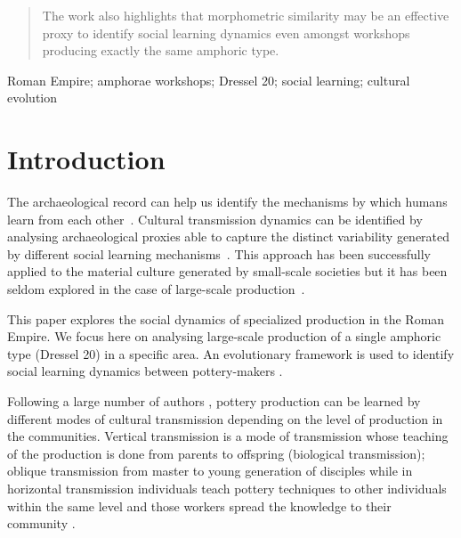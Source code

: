 \documentclass[review]{elsarticle}
\begin{document}
\begin{frontmatter}
\begin{abstract}
The work also highlights that morphometric similarity may be an effective proxy to identify social learning dynamics even amongst workshops producing exactly the same amphoric type. 

\end{abstract}


\begin{keyword}
Roman Empire; amphorae workshops; Dressel 20; social learning; cultural evolution
\end{keyword}

\end{frontmatter}

\linenumbers

\section{Introduction}

The archaeological record can help us identify the mechanisms by which humans learn from each other~\citep{richerson2005not,eerkens_jelmer_cultural_2007}. Cultural transmission dynamics can be identified by analysing archaeological proxies able to capture the distinct variability generated by different social learning mechanisms~\citep{shennan_ceramic_2001,eerkens_jelmer_cultural_2005, gandon_copying_2014}. This approach has been successfully applied to the material culture generated by small-scale societies but it has been seldom explored in the case of large-scale production~\citep{shennan_isolation-by-distance_2015}.

This paper explores the social dynamics of specialized production in the Roman Empire. We focus here on analysing large-scale production of a single amphoric type (Dressel 20) in a specific area. An evolutionary framework is used to identify social learning dynamics between pottery-makers \citep{shennan_evolution_2008,mesoudi_cultural_2015}. 

Following a large number of authors \citep{neff1992ceramics,shennan_genes_2002,bowser_learning_2008,hosfield_modes_2009}, pottery production can be learned by different modes of cultural transmission depending on the level of production in the communities. Vertical transmission is a mode of transmission whose teaching of the production is done from parents to offspring (biological transmission); oblique transmission from master to young generation of disciples while in horizontal transmission individuals teach pottery techniques to other individuals within the same level and those workers spread the knowledge to their community \citep{cavalli-sforza_cultural_1981, acerbi_cultural_2006}.
\end{document}
